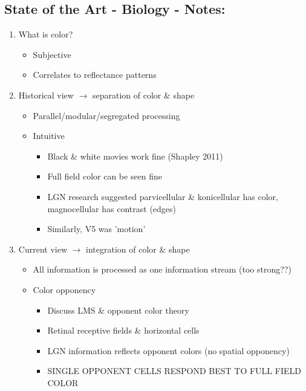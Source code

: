 \documentclass[journal,onecolumn]{IEEEtran}
\begin{document}
\subsection*{State of the Art - Biology - Notes:}
\begin{enumerate}
    \item What is color?
        \begin{itemize}
            \item Subjective
            \item Correlates to reflectance patterns
        \end{itemize}
    \item Historical view $\rightarrow$ separation of color \& shape
        \begin{itemize}
            \item Parallel/modular/segregated processing \cite{chualupa:encyclopedia}
            \item Intuitive
            \begin{itemize}
                \item Black \& white movies work fine (Shapley 2011)
                \item Full field color can be seen fine
            \end{itemize}
            \begin{itemize}
                \item LGN research suggested parvicellular \& konicellular has color, magnocellular has contrast (edges)
                \item Similarly, V5 was 'motion'
            \end{itemize}
        \end{itemize}
    \item Current view $\rightarrow$ integration of color \& shape
        \begin{itemize}
            \item All information is processed as one information stream (too strong??)
            \item Color opponency
                \begin{itemize}
                    \item Discuss LMS \& opponent color theory
                    \item Retinal receptive fields \& horizontal cells
                    \item LGN information reflects opponent colors (no spatial opponency)
                    \item SINGLE OPPONENT CELLS RESPOND BEST TO FULL FIELD COLOR

\end{itemize}
\end{itemize}
\end{enumerate}
\end{document}

